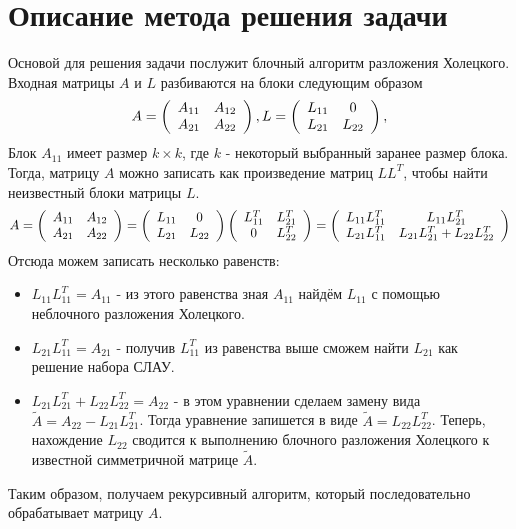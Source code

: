 \documentclass[11pt, a4paper]{article}
\def\newsection#1{
    \section{#1}
}
\begin{document}
\newsection{Описание метода решения задачи}
Основой для решения задачи послужит блочный алгоритм разложения Холецкого. Входная матрицы $A$ и $L$ разбиваются на блоки следующим образом
\[
    A =
    \left(\begin{array}{c c}
        A_{11} & A_{12} \\
        A_{21} & A_{22} \\
    \end{array}\right),
    L =
    \left(\begin{array}{c c}
        L_{11} & 0 \\
        L_{21} & L_{22} \\
    \end{array}\right),
\]
Блок $A_{11}$ имеет размер $k \times k$, где $k$ - некоторый выбранный заранее размер блока. Тогда, матрицу $A$ можно 
записать как произведение матриц $LL^T$, чтобы найти неизвестный блоки матрицы $L$.
\[
    A =
    \left(\begin{array}{c c}
        A_{11} & A_{12} \\
        A_{21} & A_{22} \\
    \end{array}\right) =
    \left(\begin{array}{c c}
        L_{11} & 0 \\
        L_{21} & L_{22} \\
    \end{array}\right)
    \left(\begin{array}{c c}
        L_{11}^T & L_{21}^T \\
        0 & L_{22}^T \\
    \end{array}\right) =
    \left(\begin{array}{c c}
        L_{11}L_{11}^T & L_{11}L_{21}^T \\
        L_{21}L_{11}^T & L_{21}L_{21}^T + L_{22}L_{22}^T \\
    \end{array}\right)
\]
Отсюда можем записать несколько равенств:
\begin{itemize}
    \item $L_{11}L_{11}^T = A_{11}$ - из этого равенства зная $A_{11}$ найдём $L_{11}$ с помощью неблочного разложения Холецкого.
    \item $L_{21}L_{11}^T = A_{21}$ - получив $L_{11}^T$ из равенства выше сможем найти $L_{21}$ как решение набора СЛАУ.
    \item $L_{21}L_{21}^T + L_{22}L_{22}^T = A_{22}$ - в этом уравнении сделаем замену вида $\tilde{A} = A_{22} - L_{21}L_{21}^T$. Тогда уравнение
    запишется в виде $\tilde{A} = L_{22}L_{22}^T$. Теперь, нахождение $L_{22}$ сводится к выполнению блочного разложения Холецкого к известной
    симметричной матрице $\tilde{A}$. 
\end{itemize}
Таким образом, получаем рекурсивный алгоритм, который последовательно обрабатывает матрицу $A$.
\end{document}
